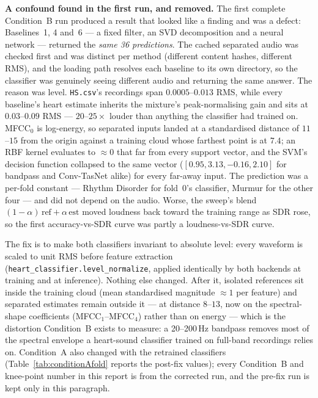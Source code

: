 \documentclass[11pt]{article}
\begin{document}
\textbf{A confound found in the first run, and removed.} The first
complete Condition~B run produced a result that looked like a finding and
was a defect: Baselines~1, 4 and~6 --- a fixed filter, an SVD
decomposition and a neural network --- returned the \emph{same 36
predictions}. The cached separated audio was checked first and was
distinct per method (different content hashes, different RMS), and the
loading path resolves each baseline to its own directory, so the
classifier was genuinely seeing different audio and returning the same
answer. The reason was level. \texttt{HS.csv}'s recordings span
$0.0005$--$0.013$ RMS, while every baseline's heart estimate inherits the
mixture's peak-normalising gain and sits at $0.03$--$0.09$ RMS ---
$20$--$25\times$ louder than anything the classifier had trained on.
MFCC$_0$ is log-energy, so separated inputs landed at a standardised
distance of $11$--$15$ from the origin against a training cloud whose
farthest point is at $7.4$; an RBF kernel evaluates to $\approx 0$ that far
from every support vector, and the SVM's decision function collapsed to
the same vector ($[0.95, 3.13, -0.16, 2.10]$ for bandpass and Conv-TasNet
alike) for every far-away input. The prediction was a per-fold constant
--- Rhythm Disorder for fold~0's classifier, Murmur for the other four
--- and did not depend on the audio. Worse, the sweep's blend
$(1-\alpha)\,\text{ref} + \alpha\,\text{est}$ moved loudness back toward
the training range as SDR rose, so the first accuracy-vs-SDR curve was
partly a loudness-vs-SDR curve.

The fix is to make both classifiers invariant to absolute level: every
waveform is scaled to unit RMS before feature extraction
(\texttt{heart\_classifier.level\_normalize}, applied identically by
both backends at training and at inference). Nothing else changed. After
it, isolated references sit inside the training cloud (mean standardised
magnitude $\approx 1$ per feature) and separated estimates remain outside
it --- at distance $8$--$13$, now on the spectral-shape coefficients
(MFCC$_1$--MFCC$_4$) rather than on energy --- which is the distortion
Condition~B exists to measure: a 20--200\,Hz bandpass removes most of the
spectral envelope a heart-sound classifier trained on full-band
recordings relies on. Condition~A also changed with the retrained
classifiers (Table~\ref{tab:conditionAfold} reports the post-fix values);
every Condition~B and knee-point number in this report is from the
corrected run, and the pre-fix run is kept only in this paragraph.
\end{document}
